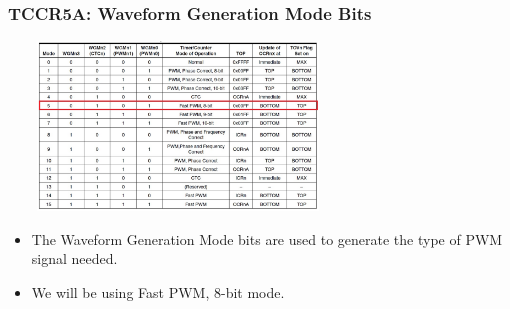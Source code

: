 \documentclass[table,10pt,red]{beamer}	%
\begin{document}
\begin{frame}
	\frametitle{TCCR5A: Waveform Generation Mode Bits}
	\centering
	\includegraphics[height=4.5cm, width=9cm]{wg_bits}
	\begin{itemize}
		\item <+-|alert@+> The Waveform Generation Mode bits are used to generate the type of PWM signal needed.
		\item <+-|alert@+> We will be using Fast PWM, 8-bit mode.
	\end{itemize}
\end{frame}
\end{document}
